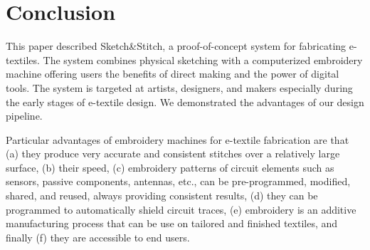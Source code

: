 \documentclass{sigchi}
\begin{document}






\section{Conclusion}
This paper described Sketch\&Stitch, a proof-of-concept system for fabricating e-textiles. The system combines physical sketching with a computerized embroidery machine offering users the benefits of direct making and the power of digital tools. The system is targeted at artists, designers, and makers especially during the early stages of e-textile design. We demonstrated the advantages of our design pipeline.


Particular advantages of embroidery machines for e-textile fabrication are that (a) they produce very accurate and consistent stitches over a relatively large surface, (b) their speed, (c) embroidery patterns of circuit elements such as sensors, passive components, antennas, etc., can be pre-programmed, modified, shared, and reused, always providing consistent results, (d) they can be programmed to automatically shield circuit traces, (e) embroidery is an additive manufacturing process that can be use on tailored and finished textiles, 
and finally (f) they are accessible to end users.


\balance{}



\end{document}
